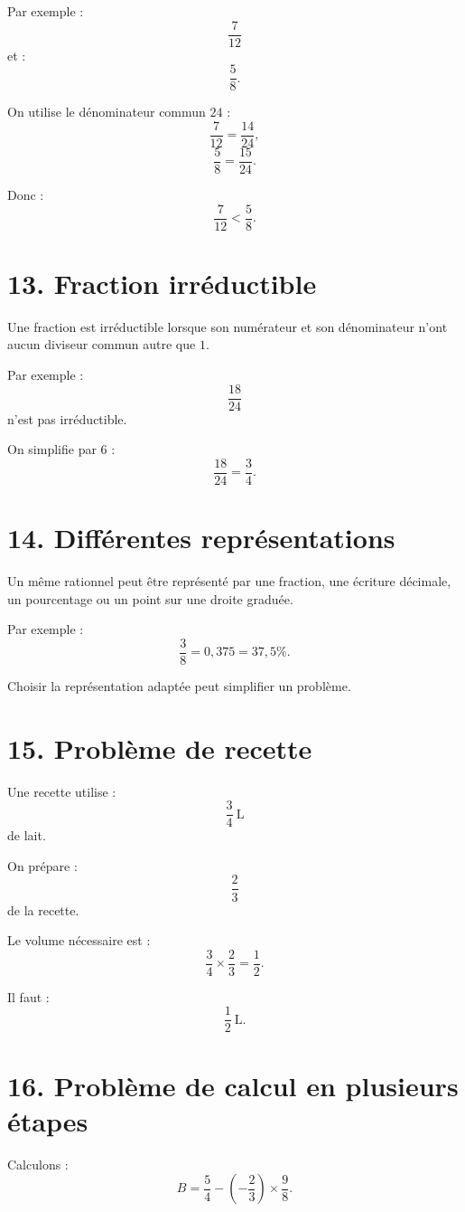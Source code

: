 Par exemple :
\[
\dfrac7{12}
\]
et :
\[
\dfrac58.
\]

On utilise le dénominateur commun $24$ :
\[
\dfrac7{12}=\dfrac{14}{24},
\]
\[
\dfrac58=\dfrac{15}{24}.
\]

Donc :
\[
\dfrac7{12}<\dfrac58.
\]

\section{13. Fraction irréductible}

\begin{definition}
Une fraction est irréductible lorsque son numérateur et son dénominateur n'ont aucun diviseur commun autre que $1$.
\end{definition}

Par exemple :
\[
\dfrac{18}{24}
\]
n'est pas irréductible.

On simplifie par $6$ :
\[
\dfrac{18}{24}=\dfrac34.
\]

\section{14. Différentes représentations}

Un même rationnel peut être représenté par une fraction, une écriture décimale, un pourcentage ou un point sur une droite graduée.

Par exemple :
\[
\dfrac38=0{,}375=37{,}5\%.
\]

Choisir la représentation adaptée peut simplifier un problème.

\section{15. Problème de recette}

Une recette utilise :
\[
\dfrac34\ \text{L}
\]
de lait.

On prépare :
\[
\dfrac23
\]
de la recette.

Le volume nécessaire est :
\[
\dfrac34\times\dfrac23
=
\dfrac12.
\]

Il faut :
\[
\boxed{\dfrac12\ \text{L}}.
\]

\section{16. Problème de calcul en plusieurs étapes}

Calculons :
\[
B=\dfrac54-\left(-\dfrac23\right)\times\dfrac98.
\]

